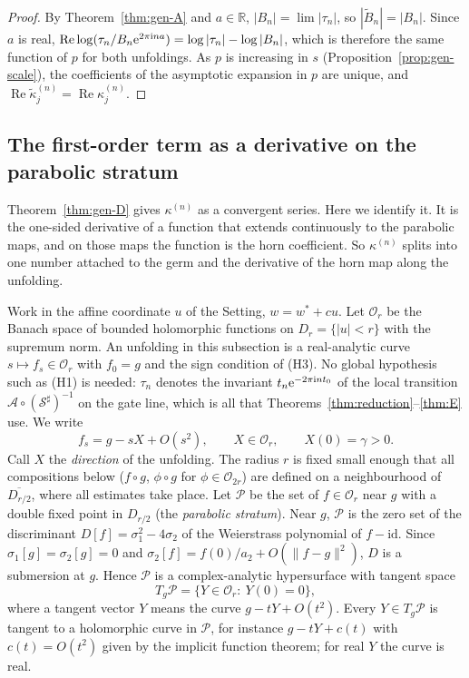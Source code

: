 \begin{proof}
By Theorem~\ref{thm:gen-A} and $a\in\mathbb R$, $|B_n|=\lim|\tau_n|$, so
$|\tilde B_n|=|B_n|$.  Since $a$ is real,
$\operatorname{Re}\log(\tau_n/B_n\mathrm{e}^{2\pi\mathrm{i} na})=\log|\tau_n|-\log|B_n|$, which is
therefore the same function of $p$ for both unfoldings.  As $p$ is increasing
in $s$ (Proposition~\ref{prop:gen-scale}), the coefficients of the asymptotic
expansion in $p$ are unique, and $\operatorname{Re}\tilde\kappa^{(n)}_j=\operatorname{Re}\kappa^{(n)}_j$.
\end{proof}

\subsection{The first-order term as a derivative on the parabolic stratum}
\label{sec:gen-variation}

Theorem~\ref{thm:gen-D} gives $\kappa^{(n)}$ as a convergent series.  Here we
identify it.  It is the one-sided derivative of a function that extends
continuously to the parabolic maps, and on those maps the function is the horn
coefficient.  So $\kappa^{(n)}$ splits into one number attached to the germ and
the derivative of the horn map along the unfolding.

Work in the affine coordinate $u$ of the Setting, $w=w^*+cu$.  Let $\mathcal O_r$ be the Banach space of
bounded holomorphic functions on $D_r=\{|u|<r\}$ with the supremum norm.  An
unfolding in this subsection is a real-analytic curve
$s\mapsto f_s\in\mathcal O_r$ with $f_0=g$ and the sign condition of
\textup{(H3)}.  No global hypothesis such as \textup{(H1)} is needed: $\tau_n$
denotes the invariant $t_n\mathrm{e}^{-2\pi\mathrm{i} nt_0}$ of the local transition
$\mathcal A\circ(\mathcal S^\sharp)^{-1}$ on the gate line, which is all that
Theorems~\ref{thm:reduction}--\ref{thm:E} use.  We write
\[
 f_s=g-sX+O(s^2),\qquad X\in\mathcal O_r,\qquad X(0)=\gamma>0 .
\]
Call $X$ the \emph{direction} of the unfolding.  The radius $r$ is fixed
small enough that all compositions below ($f\circ g$, $\phi\circ g$ for
$\phi\in\mathcal O_{2r}$) are defined on a neighbourhood of $\overline{D_{r/2}}$,
where all estimates take place.  Let $\mathcal P$ be the set of
$f\in\mathcal O_r$ near $g$ with a double fixed point in $D_{r/2}$ (the
\emph{parabolic stratum}).  Near $g$, $\mathcal P$ is the zero set of the
discriminant $D[f]=\sigma_1^2-4\sigma_2$ of the Weierstrass polynomial of
$f-\mathrm{id}$.  Since $\sigma_1[g]=\sigma_2[g]=0$ and
$\sigma_2[f]=f(0)/a_2+O(\|f-g\|^2)$, $D$ is a submersion at $g$.  Hence
$\mathcal P$ is a complex-analytic hypersurface with tangent space
\[
 T_g\mathcal P=\{Y\in\mathcal O_r:\ Y(0)=0\},
\]
where a tangent vector $Y$ means the curve $g-tY+O(t^2)$.  Every
$Y\in T_g\mathcal P$ is tangent to a holomorphic curve in $\mathcal P$, for instance
$g-tY+c(t)$ with $c(t)=O(t^2)$ given by the implicit function theorem; for
real $Y$ the curve is real.

